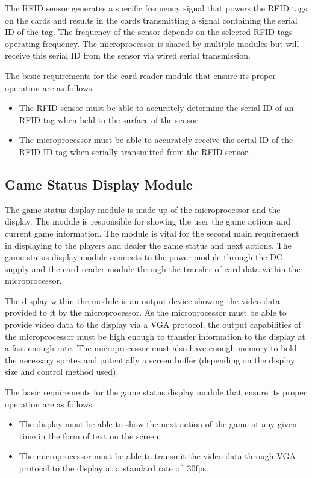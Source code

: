 \documentclass[12pt]{article}
\begin{document}
The RFID sensor generates a specific frequency signal that powers the RFID tags on the cards and results in the cards transmitting a signal containing the serial ID of the tag. The frequency of the sensor depends on the selected RFID tags operating frequency. The microprocessor is shared by multiple modules but will receive this serial ID from the sensor via wired serial transmission.

The basic requirements for the card reader module that ensure its proper operation are as follows.

\begin{itemize}
\item The RFID sensor must be able to accurately determine the serial ID of an RFID tag when held to the surface of the sensor.
\item The microprocessor must be able to accurately receive the serial ID of the RFID ID tag when serially transmitted from the RFID sensor.
\end{itemize} 

\subsection{Game Status Display Module}

The game status display module is made up of the microprocessor and the display. The module is responsible for showing the user the game actions and current game information. The module is vital for the second main requirement in displaying to the players and dealer the game status and next actions. The game status display module connects to the power module through the DC supply and the card reader module through the transfer of card data within the microprocessor.

The display within the module is an output device showing the video data provided to it by the microprocessor. As the microprocessor must be able to provide video data to the display via a VGA protocol, the output capabilities of the microprocessor must be high enough to transfer information to the display at a fast enough rate. The microprocessor must also have enough memory to hold the necessary sprites and potentially a screen buffer (depending on the display size and control method used).

The basic requirements for the game status display module that ensure its proper operation are as follows.

\begin{itemize}
\item The display must be able to show the next action of the game at any given time in the form of text on the screen.
\item The microprocessor must be able to transmit the video data through VGA protocol to the display at a standard rate of $~30$fps.
\end{itemize}
\end{document}
